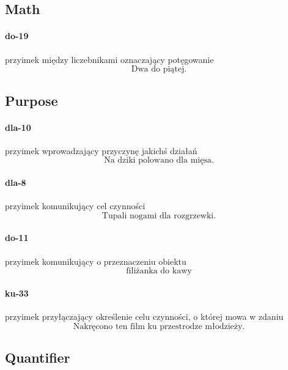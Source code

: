 \documentclass[a4paper, 12pt]{article}
\theoremstyle{remark}
\begin{document}
\subsection{Math} %
\label{sub:mod_math}
\paragraph{do-19} \label{prep-19}	przyimek między liczebnikami oznaczający potęgowanie
\begin{equation}
\text{Dwa do piątej.}
\end{equation}

\subsection{Purpose} %
\label{sub:purpose}
\paragraph{dla-10} \label{prep-10}	przyimek wprowadzający przyczynę jakichś działań
\begin{equation}
\text{Na dziki polowano dla mięsa.}
\end{equation}
\paragraph{dla-8} \label{prep-8}	przyimek komunikujący cel czynności
\begin{equation}
\text{Tupali nogami dla rozgrzewki.}
\end{equation}
\paragraph{do-11} \label{prep-11}	przyimek komunikujący o przeznaczeniu obiektu
\begin{equation}
\text{filiżanka do kawy}
\end{equation}
\paragraph{ku-33} \label{prep-33}	przyimek przyłączający określenie celu czynności, o której mowa w zdaniu
\begin{equation}
\text{Nakręcono ten film ku przestrodze młodzieży.}
\end{equation}

\subsection{Quantifier} %
\label{sub:quantifier}
\end{document}
